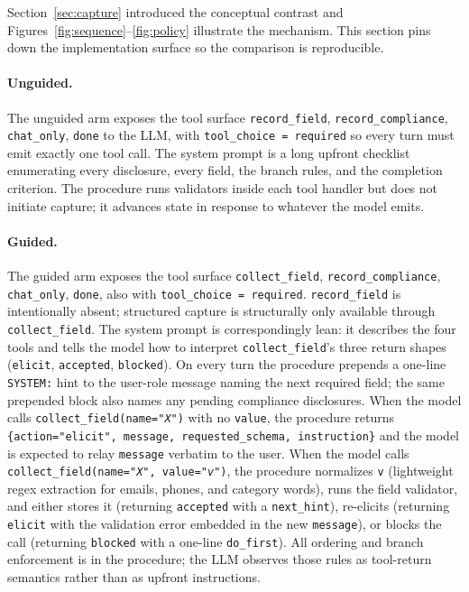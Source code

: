 \documentclass[11pt,a4paper]{article}
\begin{document}
Section~\ref{sec:capture} introduced the conceptual contrast and Figures~\ref{fig:sequence}--\ref{fig:policy} illustrate the mechanism. This section pins down the implementation surface so the comparison is reproducible.

\paragraph{Unguided.}
The unguided arm exposes the tool surface \texttt{record\_field}, \texttt{record\_compliance}, \texttt{chat\_only}, \texttt{done} to the LLM, with \texttt{tool\_choice = required} so every turn must emit exactly one tool call. The system prompt is a long upfront checklist enumerating every disclosure, every field, the branch rules, and the completion criterion. The procedure runs validators inside each tool handler but does not initiate capture; it advances state in response to whatever the model emits.

\paragraph{Guided.}
The guided arm exposes the tool surface \texttt{collect\_field}, \texttt{record\_compliance}, \texttt{chat\_only}, \texttt{done}, also with \texttt{tool\_choice = required}. \texttt{record\_field} is intentionally absent; structured capture is structurally only available through \texttt{collect\_field}. The system prompt is correspondingly lean: it describes the four tools and tells the model how to interpret \texttt{collect\_field}'s three return shapes (\texttt{elicit}, \texttt{accepted}, \texttt{blocked}). On every turn the procedure prepends a one-line \texttt{SYSTEM:} hint to the user-role message naming the next required field; the same prepended block also names any pending compliance disclosures. When the model calls \texttt{collect\_field(name="\textit{X}")} with no \texttt{value}, the procedure returns \texttt{\{action="elicit", message, requested\_schema, instruction\}} and the model is expected to relay \texttt{message} verbatim to the user. When the model calls \texttt{collect\_field(name="\textit{X}", value="\textit{v}")}, the procedure normalizes \texttt{v} (lightweight regex extraction for emails, phones, and category words), runs the field validator, and either stores it (returning \texttt{accepted} with a \texttt{next\_hint}), re-elicits (returning \texttt{elicit} with the validation error embedded in the new \texttt{message}), or blocks the call (returning \texttt{blocked} with a one-line \texttt{do\_first}). All ordering and branch enforcement is in the procedure; the LLM observes those rules as tool-return semantics rather than as upfront instructions.
\end{document}

